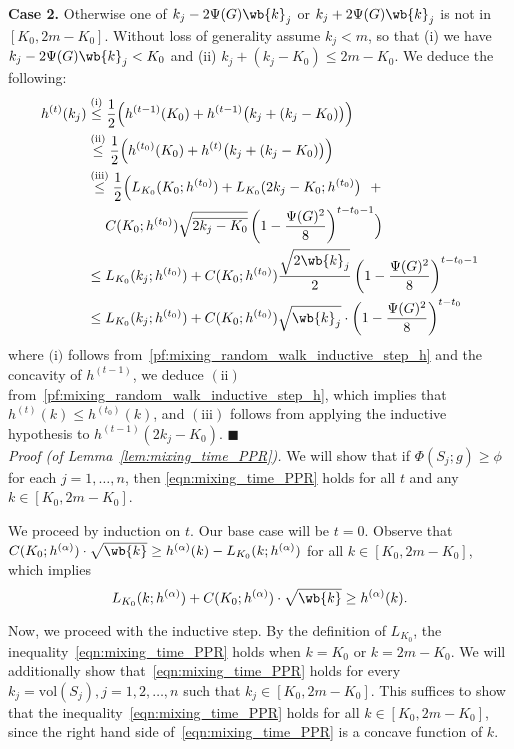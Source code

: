 \documentclass[twoside,11pt]{article}
\newcommand{\1}{\mathbf{1}}
\newcommand{\vol}{\mathrm{vol}}
\newcommand{\qed}{\hfill $\blacksquare$}
\begin{document}
\textbf{Case 2.} Otherwise one of $k_j - 2 \Psi(G) \wb{k}_j$ or $k_j + 2 \Psi(G) \wb{k}_j$ is not in $[K_0,2m  - K_0]$. Without loss of generality assume $k_j < m$, so that (i) we have $k_j - 2 \Psi(G) \wb{k}_j < K_0$ and (ii) $k_j + (k_j - K_0) \leq 2m - K_0$. We deduce the following:
\begin{align*}
h^{(t)}(k_j) & \overset{(\textrm{i})}{\leq} \frac{1}{2}\Bigl(h^{(t - 1)}(K_0) + h^{(t - 1)}\bigl(k_j + (k_j - K_0)\bigr)\Bigr) \\
& \overset{(\textrm{ii})}{\leq} \frac{1}{2}\Bigl(h^{(t_0)}(K_0) + h^{(t)}\bigl(k_j + (k_j - K_0)\bigr)\Bigr) \\
& \overset{(\textrm{iii})}{\leq}\frac{1}{2}\Bigl(L_{K_0}(K_0;h^{(t_0)}) + L_{K_0}(2k_j - K_0; h^{(t_0)}\bigr) ~~+ \\
& \quad~ C(K_0;h^{(t_0)})\sqrt{\overline{2k_j - K_0}}\left(1 - \frac{\Psi(G)^2}{8}\right)^{t - t_0 - 1}\Bigr) \\
& \leq L_{K_0}(k_j; h^{(t_0)}) + C(K_0;h^{(t_0)}) \frac{\sqrt{2\wb{k}_j}}{2} \left(1 - \frac{\Psi(G)^2}{8}\right)^{t - t_0 - 1} \\
& \leq L_{K_0}(k_j;h^{(t_0)}) + C(K_0;h^{(t_0)}) \sqrt{\wb{k}_j} \cdot \left(1 - \frac{\Psi(G)^2}{8}\right)^{t - t_0}
\end{align*}
where $\textrm{(i)}$ follows from~\eqref{pf:mixing_random_walk_inductive_step_h} and the concavity of $h^{(t - 1)}$,  we deduce $(\textrm{ii})$ from~\eqref{pf:mixing_random_walk_inductive_step_h}, which implies that $h^{(t)}(k) \leq h^{(t_0)}(k)$, and $(\textrm{iii})$ follows from applying the inductive hypothesis to $h^{(t - 1)}(2k_j - K_0)$. \qed \\

\noindent\emph{Proof (of Lemma~\ref{lem:mixing_time_PPR}).}
We will show that if $\Phi(S_j; g) \geq \phi$ for each $j = 1,\ldots,n$, then \eqref{eqn:mixing_time_PPR} holds for all $t$ and any $k \in [K_0,2m - K_0]$.

We proceed by induction on $t$. Our base case will be $t = 0$. Observe that $C(K_0;h^{(\alpha)}) \cdot \sqrt{\wb{k}} \geq h^{(\alpha)}(k) - L_{K_0}(k;h^{(\alpha)})$ for all $k \in [K_0,2m - K_0]$, which implies
\begin{equation*}
L_{K_0}(k;h^{(\alpha)}) + C(K_0;h^{(\alpha)}) \cdot \sqrt{\wb{k}} \geq h^{(\alpha)}(k).
\end{equation*}

Now, we proceed with the inductive step. By the definition of $L_{K_0}$, the inequality~\eqref{eqn:mixing_time_PPR} holds when $k = K_0$ or $k = 2m - K_0$. We will additionally show that~\eqref{eqn:mixing_time_PPR} holds for every $k_j = \vol(S_j), j = 1,2,\ldots,n$ such that $k_j \in [K_0, 2m - K_0]$. This suffices to show that the inequality~\eqref{eqn:mixing_time_PPR} holds for all $k \in [K_0,2m - K_0]$, since the right hand side of~\eqref{eqn:mixing_time_PPR} is a concave function of $k$.
\end{document}
